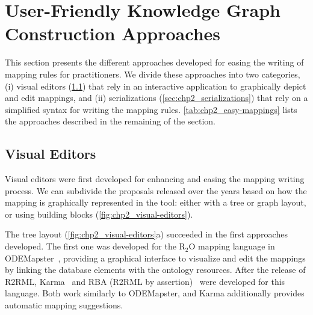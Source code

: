 \section{User-Friendly Knowledge Graph Construction Approaches}
\label{sec:chp2_easy_kgc}

This section presents the different approaches developed for easing the writing of mapping rules for practitioners. We divide these approaches into two categories, (i) visual editors (\cref{sec:chp2_visual-editors}) that rely in an interactive application to graphically depict and edit mappings, and (ii) serializations (\cref{sec:chp2_serializations}) that rely on a simplified syntax for writing the mapping rules. \cref{tab:chp2_easy-mappings} lists the approaches described in the remaining of the section.



\subsection{Visual Editors}
\label{sec:chp2_visual-editors}

Visual editors were first developed for enhancing and easing the mapping writing process. We can subdivide the proposals released over the years based on how the mapping is graphically represented in the tool: either with a tree or graph layout, or using building blocks (\cref{fig:chp2_visual-editors}).


The tree layout (\cref{fig:chp2_visual-editors}a) succeeded in the first approaches developed. 
The first one was developed for the R$_2$O mapping language in ODEMapster~\parencite{barrasa2006odemapster}, providing a graphical interface to visualize and edit the mappings by linking the database elements with the ontology resources. 
After the release of R2RML, Karma~\parencite{gupta2012karma} and RBA (R2RML by assertion)~\parencite{neto2013rba} were developed for this language. Both work similarly to ODEMapster, and Karma additionally provides automatic mapping suggestions. 

